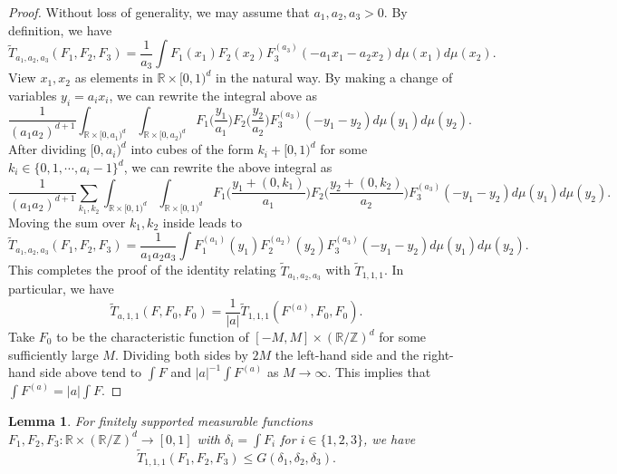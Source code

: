 \documentclass[12pt, notitlepage]{amsart}
\numberwithin{equation}{section}
\def\R{\mathbb R}
\def\Z{\mathbb Z}
\def\wt{\widetilde}
\newtheorem{lemma}[theorem]{Lemma}
\theoremstyle{remark}
\theoremstyle{definition}
\theoremstyle{remark}
\numberwithin{equation}{section}
\begin{document}
\begin{proof}
Without loss of generality, we may assume that $a_1,a_2,a_3 > 0$. By definition, we have
$$
\wt{T}_{a_1,a_2,a_3}(F_1,F_2,F_3) = \frac{1}{a_3}\int F_1(x_1) F_2(x_2) F_3^{(a_3)}(-a_1x_1-a_2x_2) d\mu(x_1) d\mu(x_2).
$$
View $x_1,x_2$ as elements in $\R\times [0,1)^d$ in the natural way. By making a change of variables $y_i = a_ix_i$, we can rewrite the integral above as
$$
\frac{1}{(a_1a_2)^{d+1}}\int_{\R \times [0,a_1)^d} \int_{\R \times [0,a_2)^d} F_1\Big(\frac{y_1}{a_1}\Big) F_2\Big(\frac{y_2}{a_2}\Big) F_3^{(a_3)}(-y_1-y_2) d\mu(y_1) d\mu(y_2).
$$
After dividing $[0,a_i)^d$ into cubes of the form $k_i + [0,1)^d$ for some $k_i\in \{0,1,\cdots,a_i-1\}^d$, we can rewrite the above integral as
$$
\frac{1}{(a_1a_2)^{d+1}} \sum_{k_1,k_2} \int_{\R\times [0,1)^d} \int_{\R\times [0,1)^d} F_1\Big(\frac{y_1 + (0,k_1)}{a_1}\Big) F_2\Big(\frac{y_2 + (0,k_2)}{a_2}\Big) F_3^{(a_3)}(-y_1-y_2) d\mu(y_1) d\mu(y_2).
$$
Moving the sum over $k_1,k_2$ inside leads to
$$
\wt{T}_{a_1,a_2,a_3}(F_1,F_2,F_3) = \frac{1}{a_1a_2a_3} \int F_1^{(a_1)}(y_1) F_2^{(a_2)}(y_2) F_3^{(a_3)}(-y_1-y_2) d\mu(y_1) d\mu(y_2).
$$
This completes the proof of the identity relating $\wt{T}_{a_1,a_2,a_3}$ with $\wt{T}_{1,1,1}$. In particular, we have
$$
\wt{T}_{a,1,1}(F, F_0, F_0) = \frac{1}{|a|}\wt{T}_{1,1,1}(F^{(a)}, F_0, F_0).
$$
Take $F_0$ to be the characteristic function of $[-M, M] \times (\R/\Z)^d$ for some sufficiently large $M$. Dividing both sides by $2M$ the left-hand side and the right-hand side above tend to $\int F$ and $|a|^{-1}\int F^{(a)}$ as $M\rightarrow \infty$. This implies that $\int F^{(a)} = |a|\int F$.
\end{proof}

\begin{lemma}\label{lem:max-T111}
For finitely supported measurable functions $F_1, F_2, F_3: \R \times (\R/\Z)^d \rightarrow [0,1]$ with $\delta_i = \int F_i$ for $i \in \{1,2,3\}$, we have
$$
\wt{T}_{1,1,1}(F_1, F_2, F_3) \leq G(\delta_1, \delta_2, \delta_3).
$$
\end{lemma}
\end{document}

